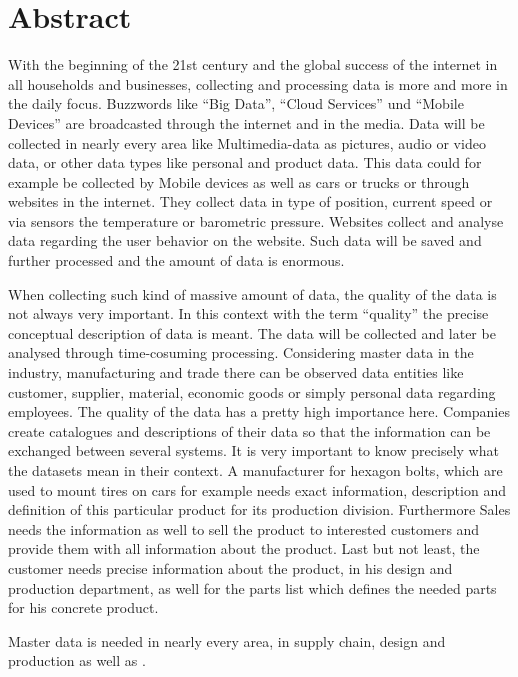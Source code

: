 \chapter*{Abstract}


With the beginning of the 21st century and the global success of the internet in all households and businesses, collecting and processing data is more and more in the daily focus. Buzzwords like \enquote{Big Data}, \enquote{Cloud Services} und \enquote{Mobile Devices} are broadcasted through the internet and in the media. Data will be collected in nearly every area like Multimedia-data as pictures, audio or video data, or other data types like personal and product data. This data could for example be collected by Mobile devices as well as cars or trucks or through websites in the internet. They collect data in type of position, current speed or via sensors the temperature or barometric pressure. Websites collect and analyse data regarding the user behavior on the website. Such data will be saved and further processed and the amount of data is enormous. 

When collecting such kind of massive amount of data, the quality of the data is not always very important. In this context with the term \enquote{quality} the precise conceptual description of data is meant. The data will be collected and later be analysed through time-cosuming processing. 
Considering master data in the industry, manufacturing and trade there can be observed data entities like customer, supplier, material, economic goods or simply personal data regarding employees. The quality of the data has a pretty high importance here. Companies create catalogues and descriptions of their data so that the information can be exchanged between several systems. It is very important to know precisely what the datasets mean in their context. A manufacturer for hexagon bolts, which are used to mount tires on cars for example needs exact information, description and definition of this particular product for its production division. Furthermore Sales needs the information as well to sell the product to interested customers and provide them with all information about the product. Last but not least, the customer needs precise information about the product, in his design and production department, as well for the parts list which defines the needed parts for his concrete product. 

Master data is needed in nearly every area, in supply chain, design and production as well as . 

